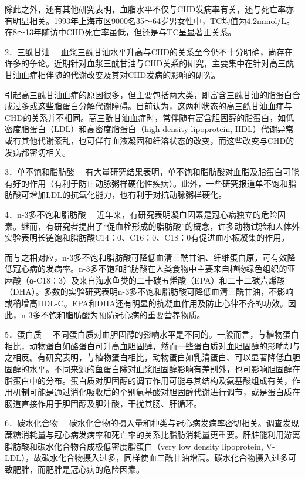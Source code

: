 除此之外，还有其他研究表明，血脂水平不仅与CHD发病率有关，还与死亡率亦有明显相关。1993年上海市区9000名35～64岁男女性中，TC均值为4.2mmol/L。在8～13年随访中CHD死亡率虽低，但还是与TC呈显著正关系。

{2．三酰甘油}
　血浆三酰甘油水平升高与CHD的关系至今仍不十分明确，尚存在许多的争论。近期针对血浆三酰甘油与CHD关系的研究，主要集中在针对高三酰甘油血症相伴随的代谢改变及其对CHD发病的影响的研究。

引起高三酰甘油血症的原因很多，但主要包括两大类，即富含三酰甘油的脂蛋白合成过多或这些脂蛋白分解代谢障碍。目前认为，这两种状态的高三酰甘油血症与CHD的关系并不相同。高三酰甘油血症时，常伴随有富含胆固醇的脂蛋白，如低密度脂蛋白（LDL）和高密度脂蛋白（high-density
lipoprotein,
HDL）代谢异常或有其他代谢紊乱，也可伴有血液凝固和纤溶状态的改变，而这些改变与CHD的发病都密切相关。

{3．单不饱和脂肪酸}
　有大量研究结果表明，单不饱和脂肪酸对血脂及脂蛋白可能有好的作用（有利于防止动脉粥样硬化性疾病）。此外，一些研究报道单不饱和脂肪酸可增加LDL的抗氧化能力，也有利于对抗动脉粥样硬化。

{4．n-3多不饱和脂肪酸}
　近年来，有研究表明凝血因素是冠心病独立的危险因素。继而，有研究者提出了“促血栓形成的脂肪酸”的概念，许多动物试验和人体外实验表明长链饱和脂肪酸C14：0、C16：0、C18：0有促进血小板凝集的作用。

而与之相对应，n-3多不饱和脂肪酸可降低血清三酰甘油、纤维蛋白原，可有效降低冠心病的发病率。n-3多不饱和脂肪酸在人类食物中主要来自植物绿色组织的亚麻酸（α-C18：3）及来自海水鱼类的二十碳五烯酸（EPA）和二十二碳六烯酸（DHA）。多数的实验研究表明n-3多不饱和脂肪酸可降低血清三酰甘油，不影响或稍增高HDL-C。EPA和DHA还有明显的抗凝血作用及防止心律不齐的功效。因此，n-3多不饱和脂肪酸为预防冠心病的重要营养物质。

{5．蛋白质}
　不同蛋白质对血胆固醇的影响水平是不同的。一般而言，与植物蛋白相比，动物蛋白如酪蛋白可升高血胆固醇，然而一些蛋白质对血胆固醇的影响却与之相反。有研究表明，与植物蛋白相比，动物蛋白如乳清蛋白、可以显著降低血胆固醇的水平。不同来源的鱼蛋白除对血浆胆固醇影响有差别外，也可影响胆固醇在脂蛋白中的分布。蛋白质对胆固醇的调节作用可能与其结构及氨基酸组成有关，作用机制可能是通过消化吸收后的个别氨基酸对胆固醇代谢进行调节，或是蛋白质在肠道直接作用于胆固醇及胆汁酸，干扰其肠、肝循环。

{6．碳水化合物}
　碳水化合物的摄入量和种类与冠心病发病率密切相关。调查发现蔗糖消耗量与冠心病发病率和死亡率的关系比脂肪消耗量更重要。肝脏能利用游离脂肪酸和碳水化合物合成极低密度脂蛋白（very
low density lipoprotein,
V-LDL），故碳水化合物摄入过多，同样使血三酰甘油增高。碳水化合物摄入过多可致肥胖，而肥胖是冠心病的危险因素。

